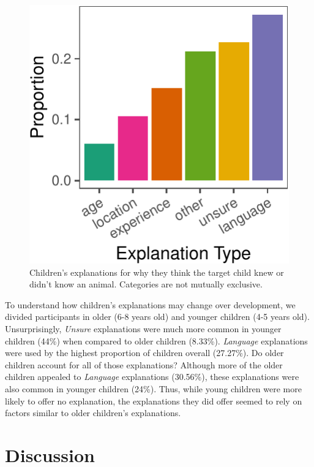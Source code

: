 \documentclass[10pt, letterpaper]{article}
\newenvironment{CodeChunk}{}{}
\begin{document}
\begin{CodeChunk}
\begin{figure}[tb]
\includegraphics{figs/explanations-1} \caption[Children's explanations for why they think the target child knew or didn't know an animal]{Children's explanations for why they think the target child knew or didn't know an animal. Categories are not mutually exclusive.}\label{fig:explanations}
\end{figure}
\end{CodeChunk}

To understand how children's explanations may change over development,
we divided participants in older (6-8 years old) and younger children
(4-5 years old). Unsurprisingly, \emph{Unsure} explanations were much
more common in younger children (44\%) when compared to older children
(8.33\%). \emph{Language} explanations were used by the highest
proportion of children overall (27.27\%). Do older children account for
all of those explanations? Although more of the older children appealed
to \emph{Language} explanations (30.56\%), these explanations were also
common in younger children (24\%). Thus, while young children were more
likely to offer no explanation, the explanations they did offer seemed
to rely on factors similar to older children's explanations.

\hypertarget{discussion}{%
\section{Discussion}\label{discussion}}
\end{document}
